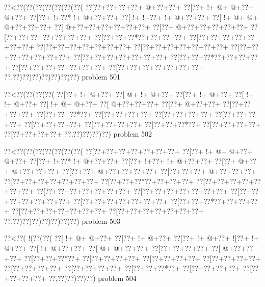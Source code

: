 \vbox{\vbox{\goo
\0??<\0??(\0??(\0??(\0??(\0??(\0??(\0??(
\0??[\0??+\0??+\0??+\0??+\- @+\0??+\0??+
\0??[\0??+\- !+\- @+\- @+\0??+\- @+\0??+
\0??[\0??+\- !+\0??*\- !+\- @+\0??+\0??+
\0??[\- !+\- !+\0??+\- !+\- @+\0??+\0??+
\0??[\- !+\- @+\- @+\- @+\0??+\0??+\0??+
\0??[\- @+\0??+\0??+\0??+\0??+\0??+\0??+
\0??[\0??+\- @+\0??+\0??+\0??+\0??+\0??+
\0??[\0??+\0??+\0??+\0??+\0??+\0??+\0??+
\0??[\0??+\0??+\0??*\0??+\0??+\0??+\0??+
\0??[\0??+\0??+\0??+\0??+\0??+\0??+\0??+
\0??[\0??+\0??+\0??+\0??+\0??+\0??+\0??+
\0??[\0??+\0??+\0??+\0??+\0??+\0??+\0??+
\0??[\0??+\0??+\0??+\0??+\0??+\0??+\0??+
\0??[\0??+\0??+\0??+\0??+\0??+\0??+\0??+
\0??[\0??+\0??+\0??*\0??+\0??+\0??+\0??+
\0??[\0??+\0??+\0??+\0??+\0??+\0??+\0??+
\0??[\0??+\0??+\0??+\0??+\0??+\0??+\0??+
\0??,\0??)\0??)\0??)\0??)\0??)\0??)\0??)
}
\hfil problem 501\hfil\break
}

\vbox{\vbox{\goo
\0??<\0??(\0??(\0??(\0??(
\0??[\0??+\- !+\- @+\0??+
\0??[\- @+\- !+\- @+\0??+
\0??[\0??+\- !+\- @+\0??+
\0??[\- !+\- !+\- @+\0??+
\0??[\- !+\- @+\- @+\0??+
\0??[\- @+\0??+\0??+\0??+
\0??[\0??+\- @+\0??+\0??+
\0??[\0??+\0??+\0??+\0??+
\0??[\0??+\0??+\0??*\0??+
\0??[\0??+\0??+\0??+\0??+
\0??[\0??+\0??+\0??+\0??+
\0??[\0??+\0??+\0??+\0??+
\0??[\0??+\0??+\0??+\0??+
\0??[\0??+\0??+\0??+\0??+
\0??[\0??+\0??+\0??*\0??+
\0??[\0??+\0??+\0??+\0??+
\0??[\0??+\0??+\0??+\0??+
\0??,\0??)\0??)\0??)\0??)
}
\hfil problem 502\hfil\break
}

\vbox{\vbox{\goo
\0??<\0??(\0??(\0??(\0??(\0??(\0??(\0??(
\0??[\0??+\0??+\0??+\0??+\0??+\0??+\0??+
\0??[\0??+\- !+\- @+\- @+\0??+\- @+\0??+
\0??[\0??+\- !+\0??*\- !+\- @+\0??+\0??+
\0??[\0??+\- !+\0??+\- !+\- @+\0??+\0??+
\0??[\0??+\- @+\0??+\- @+\0??+\0??+\0??+
\0??[\0??+\0??+\- @+\0??+\0??+\0??+\0??+
\0??[\0??+\0??+\0??+\- @+\0??+\0??+\0??+
\0??[\0??+\0??+\0??+\0??+\0??+\0??+\0??+
\0??[\0??+\0??+\0??*\0??+\0??+\0??+\0??+
\0??[\0??+\0??+\0??+\0??+\0??+\0??+\0??+
\0??[\0??+\0??+\0??+\0??+\0??+\0??+\0??+
\0??[\0??+\0??+\0??+\0??+\0??+\0??+\0??+
\0??[\0??+\0??+\0??+\0??+\0??+\0??+\0??+
\0??[\0??+\0??+\0??+\0??+\0??+\0??+\0??+
\0??[\0??+\0??+\0??*\0??+\0??+\0??+\0??+
\0??[\0??+\0??+\0??+\0??+\0??+\0??+\0??+
\0??[\0??+\0??+\0??+\0??+\0??+\0??+\0??+
\0??,\0??)\0??)\0??)\0??)\0??)\0??)\0??)
}
\hfil problem 503\hfil\break
}

\vbox{\vbox{\goo
\0??<\0??(\- !(\0??(\0??(
\0??[\- !+\- @+\- @+\0??+
\0??[\0??+\- !+\- @+\0??+
\0??[\0??+\- !+\- @+\0??+
\- ![\0??+\- !+\- @+\0??+
\0??[\- !+\- @+\0??+\0??+
\0??[\- @+\- @+\0??+\0??+
\0??[\0??+\0??+\0??+\0??+
\0??[\- @+\0??+\0??+\0??+
\0??[\0??+\0??+\0??*\0??+
\0??[\0??+\0??+\0??+\0??+
\0??[\0??+\0??+\0??+\0??+
\0??[\0??+\0??+\0??+\0??+
\0??[\0??+\0??+\0??+\0??+
\0??[\0??+\0??+\0??+\0??+
\0??[\0??+\0??+\0??*\0??+
\0??[\0??+\0??+\0??+\0??+
\0??[\0??+\0??+\0??+\0??+
\0??,\0??)\0??)\0??)\0??)
}
\hfil problem 504\hfil\break
}

